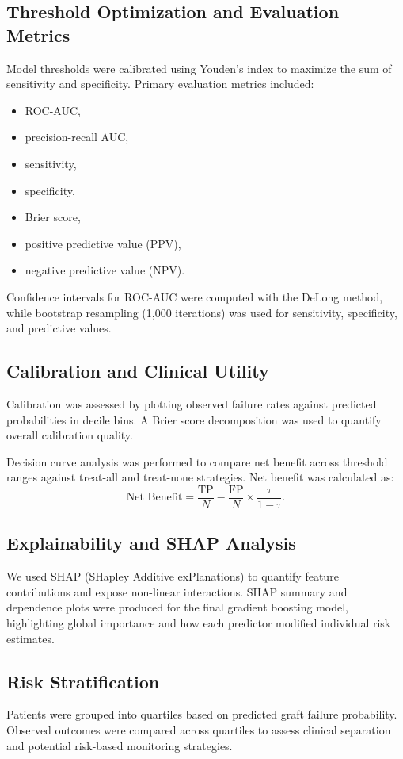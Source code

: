 \documentclass[11pt,a4paper]{article}
\begin{document}
\subsection{Threshold Optimization and Evaluation Metrics}
Model thresholds were calibrated using Youden's index to maximize the sum of sensitivity and specificity. Primary evaluation metrics included:
\begin{itemize}
    \item ROC-AUC,
    \item precision-recall AUC,
    \item sensitivity,
    \item specificity,
    \item Brier score,
    \item positive predictive value (PPV),
    \item negative predictive value (NPV).
\end{itemize}
Confidence intervals for ROC-AUC were computed with the DeLong method, while bootstrap resampling (1,000 iterations) was used for sensitivity, specificity, and predictive values.

\subsection{Calibration and Clinical Utility}
Calibration was assessed by plotting observed failure rates against predicted probabilities in decile bins. A Brier score decomposition was used to quantify overall calibration quality.

Decision curve analysis was performed to compare net benefit across threshold ranges against treat-all and treat-none strategies. Net benefit was calculated as:
\begin{equation}
\text{Net Benefit} = \frac{\text{TP}}{N} - \frac{\text{FP}}{N} \times \frac{\tau}{1-\tau}.
\end{equation}

\subsection{Explainability and SHAP Analysis}
We used SHAP (SHapley Additive exPlanations) to quantify feature contributions and expose non-linear interactions. SHAP summary and dependence plots were produced for the final gradient boosting model, highlighting global importance and how each predictor modified individual risk estimates.

\subsection{Risk Stratification}
Patients were grouped into quartiles based on predicted graft failure probability. Observed outcomes were compared across quartiles to assess clinical separation and potential risk-based monitoring strategies.
\end{document}
